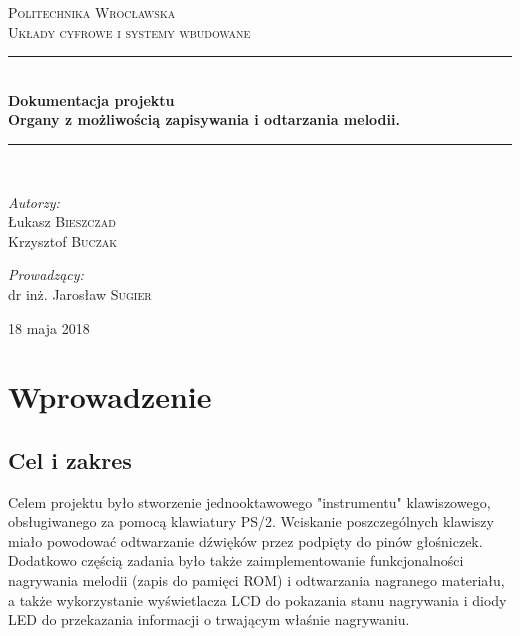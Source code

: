 \documentclass[a4paper,11pt]{article}
\begin{document}
\begin{titlepage}

\newcommand{\HRule}{\rule{\linewidth}{0.5mm}}
\center
 
\textsc{\LARGE Politechnika Wrocławska}\\[1.5cm] 
\textsc{\Large Układy cyfrowe i systemy wbudowane}\\[0.5cm] %

\HRule \\[0.5cm]
{ \huge \bfseries Dokumentacja projektu \\ Organy z możliwością zapisywania i odtarzania melodii.}\\[0.5cm] %
\HRule \\[1.6cm]
 
\begin{flushleft} \large

\emph{Autorzy:}\\
Łukasz  \textsc{Bieszczad}\\ %
Krzysztof  \textsc{Buczak}\\ %

\end{flushleft}

\begin{flushright} \large

\emph{Prowadzący:} \\
dr inż. Jarosław \textsc{Sugier} %

\end{flushright}

\vfill
{\large 18 maja 2018}\\[3cm] %


\end{titlepage}

\tableofcontents
\newpage

\section{Wprowadzenie}
\subsection{Cel i zakres}
Celem projektu było stworzenie jednooktawowego "instrumentu" klawiszowego, obsługiwanego za pomocą klawiatury PS/2. Wciskanie poszczególnych klawiszy miało powodować odtwarzanie dźwięków przez podpięty do pinów głośniczek. Dodatkowo częścią zadania było także zaimplementowanie funkcjonalności nagrywania melodii (zapis do pamięci ROM) i odtwarzania nagranego materiału, a także wykorzystanie wyświetlacza LCD do pokazania stanu nagrywania i diody LED do przekazania informacji o trwającym właśnie nagrywaniu.
\end{document}
